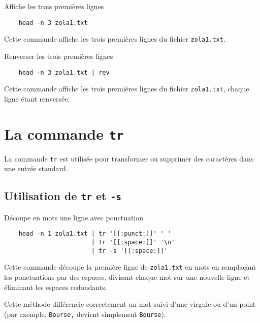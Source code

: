 \documentclass[a4paper]{report}
\begin{document}
    \begin{EExample}{Affiche les trois premières lignes}{}
        \begin{verbatim}
    head -n 3 zola1.txt
        \end{verbatim}
        Cette commande affiche les trois premières lignes du fichier 
        \texttt{zola1.txt}.
    \end{EExample}

    \begin{EExample}{Renverser les trois premières lignes}{}
        \begin{verbatim}
    head -n 3 zola1.txt | rev
        \end{verbatim}
        Cette commande affiche les trois premières lignes du fichier 
        \texttt{zola1.txt}, chaque ligne étant renversée.
    \end{EExample}

    \section{La commande \texttt{tr}}

    \begin{Définition}
        La commande \texttt{tr} est utilisée pour transformer ou supprimer des 
        caractères dans une entrée standard. 
    \end{Définition}
    \subsection{Utilisation de \texttt{tr} et \texttt{-s}}

    \begin{EExample}{Découpe en mots une ligne avec ponctuation}{}
        \begin{verbatim}
    head -n 1 zola1.txt | tr '[[:punct:]]' ' ' 
                        | tr '[[:space:]]' '\n' 
                        | tr -s '[[:space:]]'
        \end{verbatim}
        Cette commande découpe la première ligne de \texttt{zola1.txt} en mots en 
        remplaçant les ponctuations par des espaces, divisant chaque mot sur une 
        nouvelle ligne et éliminant les espaces redondants.

        \vspace{0.5em}

        \noindent{}  
        Cette méthode différencie correctement un mot suivi d'une virgule ou d'un 
        point (par exemple, \texttt{Bourse,} devient simplement \texttt{Bourse}).
    \end{EExample}
\end{document}
